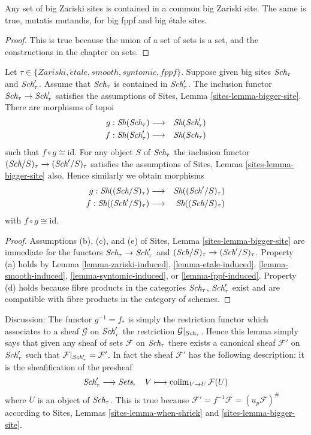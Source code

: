 \begin{lemma}
\label{lemma-contained-in}
Any set of big Zariski sites is contained in a common big Zariski site.
The same is true, mutatis mutandis, for big fppf and big \'etale sites.
\end{lemma}

\begin{proof}
This is true because the union of a set of sets is a set, and the
constructions in the chapter on sets.
\end{proof}

\begin{lemma}
\label{lemma-change-alpha}
Let $\tau \in \{Zariski, \acute{e}tale, smooth, syntomic, fppf\}$.
Suppose given big sites $\textit{Sch}_\tau$ and $\textit{Sch}'_\tau$.
Assume that $\textit{Sch}_\tau$ is contained in $\textit{Sch}'_\tau$.
The inclusion functor $\textit{Sch}_\tau \to \textit{Sch}'_\tau$ satisfies
the assumptions of Sites, Lemma \ref{sites-lemma-bigger-site}.
There are morphisms of topoi
\begin{eqnarray*}
g : \mathop{\textit{Sh}}\nolimits(\textit{Sch}_\tau) &
\longrightarrow &
\mathop{\textit{Sh}}\nolimits(\textit{Sch}'_\tau) \\
f : \mathop{\textit{Sh}}\nolimits(\textit{Sch}'_\tau) &
\longrightarrow &
\mathop{\textit{Sh}}\nolimits(\textit{Sch}_\tau)
\end{eqnarray*}
such that $f \circ g \cong \text{id}$. For any object $S$
of $\textit{Sch}_\tau$ the inclusion functor
$(\textit{Sch}/S)_\tau \to (\textit{Sch}'/S)_\tau$ satisfies
the assumptions of Sites, Lemma \ref{sites-lemma-bigger-site}
also. Hence similarly we obtain morphisms
\begin{eqnarray*}
g : \mathop{\textit{Sh}}\nolimits((\textit{Sch}/S)_\tau) &
\longrightarrow &
\mathop{\textit{Sh}}\nolimits((\textit{Sch}'/S)_\tau) \\
f : \mathop{\textit{Sh}}\nolimits((\textit{Sch}'/S)_\tau) &
\longrightarrow &
\mathop{\textit{Sh}}\nolimits((\textit{Sch}/S)_\tau)
\end{eqnarray*}
with $f \circ g \cong \text{id}$.
\end{lemma}

\begin{proof}
Assumptions (b), (c), and (e) of
Sites, Lemma \ref{sites-lemma-bigger-site}
are immediate for the functors
$\textit{Sch}_\tau \to \textit{Sch}'_\tau$ and
$(\textit{Sch}/S)_\tau \to (\textit{Sch}'/S)_\tau$. Property (a) holds by
Lemma \ref{lemma-zariski-induced},
\ref{lemma-etale-induced},
\ref{lemma-smooth-induced},
\ref{lemma-syntomic-induced}, or
\ref{lemma-fppf-induced}.
Property (d) holds because
fibre products in the categories $\textit{Sch}_\tau$, $\textit{Sch}'_\tau$
exist and are compatible with fibre products in the category of schemes.
\end{proof}

\noindent
Discussion:
The functor $g^{-1} = f_*$ is simply the restriction functor which associates
to a sheaf $\mathcal{G}$ on $\textit{Sch}'_\tau$ the restriction
$\mathcal{G}|_{\textit{Sch}_\tau}$. Hence this lemma simply says that given
any sheaf of sets $\mathcal{F}$ on $\textit{Sch}_\tau$ there exists a
canonical sheaf $\mathcal{F}'$ on $\textit{Sch}'_\tau$ such that
$\mathcal{F}|_{\textit{Sch}'_\tau} = \mathcal{F}'$. In fact the sheaf
$\mathcal{F}'$ has the following description: it is the sheafification
of the presheaf
$$
\textit{Sch}'_\tau \longrightarrow \textit{Sets}, \quad
V \longmapsto \mathop{\rm colim}\nolimits_{V \to U} \mathcal{F}(U)
$$
where $U$ is an object of $\textit{Sch}_\tau$. This is true because
$\mathcal{F}' = f^{-1}\mathcal{F} = (u_p\mathcal{F})^\#$ according to
Sites, Lemmas \ref{sites-lemma-when-shriek} and \ref{sites-lemma-bigger-site}.









